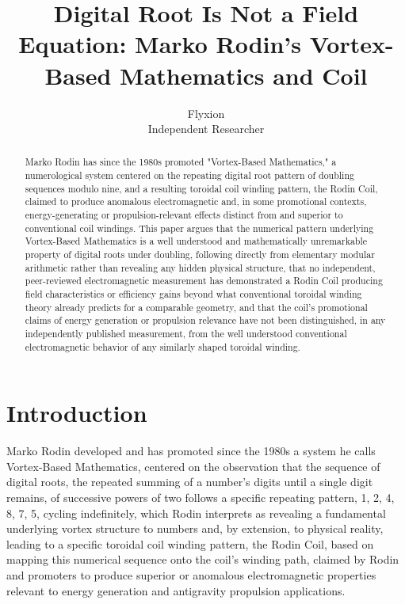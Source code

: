 \documentclass[11pt]{article}
\title{Digital Root Is Not a Field Equation: Marko Rodin's Vortex-Based Mathematics and Coil}
\author{Flyxion \\ \small Independent Researcher}
\date{}
\begin{document}
\maketitle

\begin{abstract}
Marko Rodin has since the 1980s promoted "Vortex-Based Mathematics," a numerological system centered on the repeating digital root pattern of doubling sequences modulo nine, and a resulting toroidal coil winding pattern, the Rodin Coil, claimed to produce anomalous electromagnetic and, in some promotional contexts, energy-generating or propulsion-relevant effects distinct from and superior to conventional coil windings. This paper argues that the numerical pattern underlying Vortex-Based Mathematics is a well understood and mathematically unremarkable property of digital roots under doubling, following directly from elementary modular arithmetic rather than revealing any hidden physical structure, that no independent, peer-reviewed electromagnetic measurement has demonstrated a Rodin Coil producing field characteristics or efficiency gains beyond what conventional toroidal winding theory already predicts for a comparable geometry, and that the coil's promotional claims of energy generation or propulsion relevance have not been distinguished, in any independently published measurement, from the well understood conventional electromagnetic behavior of any similarly shaped toroidal winding.
\end{abstract}

\section{Introduction}

Marko Rodin developed and has promoted since the 1980s a system he calls Vortex-Based Mathematics, centered on the observation that the sequence of digital roots, the repeated summing of a number's digits until a single digit remains, of successive powers of two follows a specific repeating pattern, 1, 2, 4, 8, 7, 5, cycling indefinitely, which Rodin interprets as revealing a fundamental underlying vortex structure to numbers and, by extension, to physical reality, leading to a specific toroidal coil winding pattern, the Rodin Coil, based on mapping this numerical sequence onto the coil's winding path, claimed by Rodin and promoters to produce superior or anomalous electromagnetic properties relevant to energy generation and antigravity propulsion applications.
\end{document}
